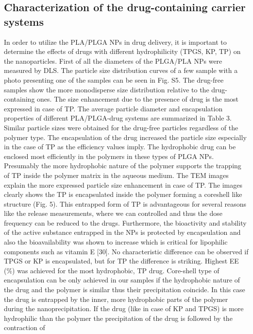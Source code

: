 \documentclass[11pt,letterpaper]{article}
\begin{document}
	\subsection{Characterization of the drug-containing carrier systems}
	
	In order to utilize the PLA/PLGA NPs in drug delivery, it is important to determine the effects of drugs with different hydrophilicity
	(TPGS, KP, TP) on the nanoparticles. First of all the diameters of the
	PLGA/PLA NPs were measured by DLS. The particle size distribution
	curves of a few sample with a photo presenting one of the samples can
	be seen in Fig. S5. The drug-free samples show the more monodisperse
	size distribution relative to the drug-containing ones. The size enhancement due to the presence of drug is the most expressed in case of
	TP. The average particle diameter and encapsulation properties of different PLA/PLGA-drug systems are summarized in Table 3.
	Similar particle sizes were obtained for the drug-free particles regardless of the polymer type. The encapsulation of the drug increased
	the particle size especially in the case of TP as the efficiency values
	imply. The hydrophobic drug can be enclosed most efficiently in the
	polymers in these types of PLGA NPs. Presumably the more hydrophobic nature of the polymer supports the trapping of TP inside the
	polymer matrix in the aqueous medium. The TEM images explain the
	more expressed particle size enhancement in case of TP. The images
	clearly shows the TP is encapsulated inside the polymer forming a coreshell like structure (Fig. 5). This entrapped form of TP is advantageous
	for several reasons like the release measurements, where we can controlled and thus the dose frequency can be reduced to the drugs. Furthermore, the bioactivity and stability of the active substance entrapped
	in the NPs is protected by encapsulation and also the bioavailability was
	shown to increase which is critical for lipophilic components such as
	vitamin E [30]. No characteristic difference can be observed if TPGS or
	KP is encapsulated, but for TP the difference is striking.
	Highest EE (\%) was achieved for the most hydrophobic, TP drug.
	Core-shell type of encapsulation can be only achieved in our samples if
	the hydrophobic nature of the drug and the polymer is similar thus their
	precipitation coincide. In this case the drug is entrapped by the inner,
	more hydrophobic parts of the polymer during the nanoprecipitation. If
	the drug (like in case of KP and TPGS) is more hydrophilic than the
	polymer the precipitation of the drug is followed by the contraction of
\end{document}
